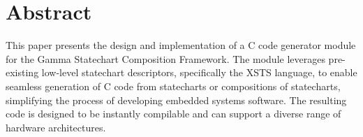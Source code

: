 \setcounter{page}{1}

\chapter*{Abstract}

This paper presents the design and implementation of a C code generator module for the Gamma Statechart Composition Framework. The module leverages pre-existing low-level statechart descriptors, specifically the XSTS language, to enable seamless generation of C code from statecharts or compositions of statecharts, simplifying the process of developing embedded systems software. The resulting code is designed to be instantly compilable and can support a diverse range of hardware architectures.


\vfill
\cleardoublepage

\selectthesislanguage

\setcounter{romanPage}{\value{page}}
